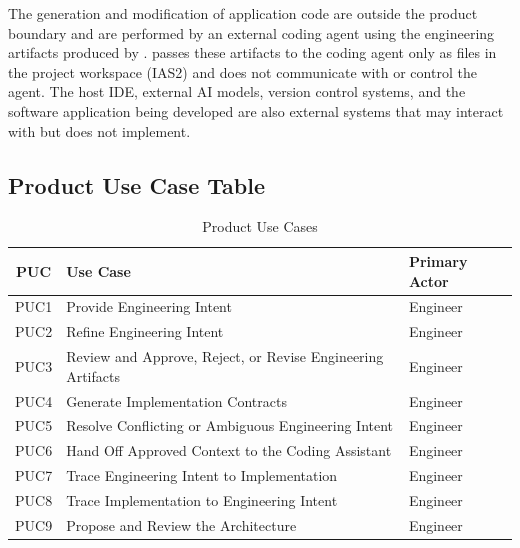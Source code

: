 \documentclass[12pt]{article}
\begin{document}
The generation and modification of application code are outside the product
boundary and are performed by an external coding agent using the engineering
artifacts produced by \progname{}. \progname{} passes these artifacts to the
coding agent only as files in the project workspace (IAS2) and does not
communicate with or control the agent. The host IDE, external AI models, version
control systems, and the software application being developed are also external
systems that \progname{} may interact with but does not implement.

\subsection{Product Use Case Table}

\begin{table}[H]
\centering
\caption{Product Use Cases}
\begin{tabular}{|c|p{7cm}|p{4cm}|}
\hline
\textbf{PUC} & \textbf{Use Case} & \textbf{Primary Actor} \\
\hline

PUC1 & Provide Engineering Intent & Engineer \\
\hline

PUC2 & Refine Engineering Intent & Engineer \\
\hline

PUC3 & Review and Approve, Reject, or Revise Engineering Artifacts & Engineer \\
\hline

PUC4 & Generate Implementation Contracts & Engineer \\
\hline

PUC5 & Resolve Conflicting or Ambiguous Engineering Intent & Engineer \\
\hline

PUC6 & Hand Off Approved Context to the Coding Assistant & Engineer \\
\hline

PUC7 & Trace Engineering Intent to Implementation & Engineer \\
\hline

PUC8 & Trace Implementation to Engineering Intent & Engineer \\
\hline

PUC9 & Propose and Review the Architecture & Engineer \\
\hline

\end{tabular}
\end{table}
\end{document}
